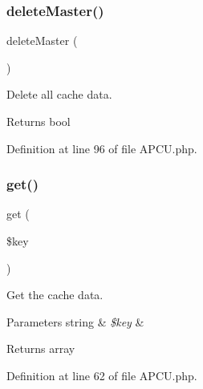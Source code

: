 \mbox{\label{class_zest_1_1_cache_1_1_a_p_c_u_1_1_a_p_c_u_a8c506f34ffddafc896eb96958b813d58}} 
\subsubsection{\texorpdfstring{delete\+Master()}{deleteMaster()}}
{\footnotesize\ttfamily delete\+Master (\begin{DoxyParamCaption}{ }\end{DoxyParamCaption})}

Delete all cache data.

\begin{DoxyReturn}{Returns}
bool 
\end{DoxyReturn}


Definition at line 96 of file A\+P\+C\+U.\+php.

\mbox{\label{class_zest_1_1_cache_1_1_a_p_c_u_1_1_a_p_c_u_a24a9bf83a1002d46ece83a93d14bd921}} 
\subsubsection{\texorpdfstring{get()}{get()}}
{\footnotesize\ttfamily get (\begin{DoxyParamCaption}\item[{}]{\$key }\end{DoxyParamCaption})}

Get the cache data.


\begin{DoxyParams}[1]{Parameters}
string & {\em \$key} & \\
\hline
\end{DoxyParams}
\begin{DoxyReturn}{Returns}
array 
\end{DoxyReturn}


Definition at line 62 of file A\+P\+C\+U.\+php.

